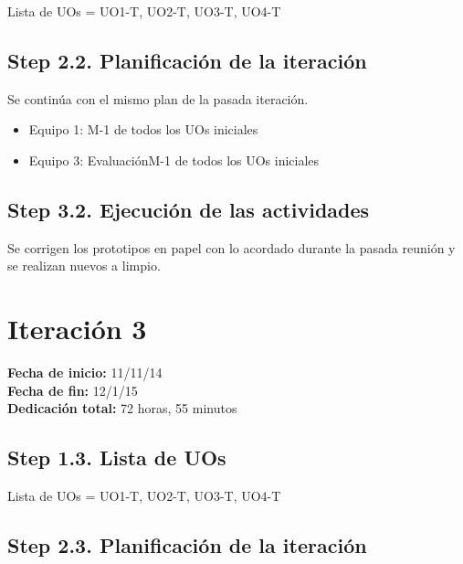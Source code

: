 Lista de UOs = {UO1-T, UO2-T, UO3-T, UO4-T}

\subsection{Step 2.2. Planificación de la iteración}
\label{it2:2.2}

Se continúa con el mismo plan de la pasada iteración.

\begin{itemize}
\item Equipo 1: M-1 de todos los UOs iniciales
\item Equipo 3: Evaluación{M-1 de todos los UOs iniciales}
\end{itemize}

\subsection{Step 3.2. Ejecución de las actividades}
\label{it2:3.2}

Se corrigen los prototipos en papel con lo acordado durante la pasada reunión y se realizan nuevos a limpio.\\


\section{Iteración 3}
\label{it3}

\begin{flushleft}
\textbf{Fecha de inicio:} 11/11/14\\
\textbf{Fecha de fin:} 12/1/15\\
\textbf{Dedicación total:} 72 horas, 55 minutos\\
\end{flushleft}

\subsection{Step 1.3. Lista de UOs}
\label{it3:1.3}

Lista de UOs = {UO1-T, UO2-T, UO3-T, UO4-T}

\subsection{Step 2.3. Planificación de la iteración}
\label{it2:2.3}

